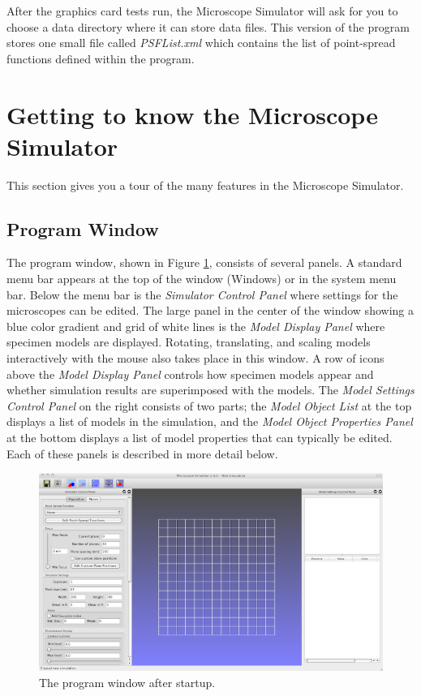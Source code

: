 \documentclass[11pt,titlepage,twoside]{article}
\begin{document}
After the graphics card tests run, the Microscope Simulator will ask for you to choose a data directory where it can store data files. This version of the program stores one small file called \emph{PSFList.xml} which contains the list of point-spread functions defined within the program.

\section{Getting to know the Microscope Simulator}

This section gives you a tour of the many features in the Microscope Simulator.

\subsection{Program Window}

The program window, shown in Figure \ref{fig:ProgramWindow}, consists of several panels. A standard menu bar appears at the top of the window (Windows) or in the system menu bar. Below the menu bar is the \emph{Simulator Control Panel} where settings for the microscopes can be edited. The large panel in the center of the window showing a blue color gradient and grid of white lines is the \emph{Model Display Panel} where specimen models are displayed. Rotating, translating, and scaling models interactively with the mouse also takes place in this window. A row of icons above the \emph{Model Display Panel} controls how specimen models appear and whether simulation results are superimposed with the models. The \emph{Model Settings Control Panel} on the right consists of two parts; the \emph{Model Object List} at the top displays a list of models in the simulation, and the \emph{Model Object Properties Panel} at the bottom displays a list of model properties that can typically be edited. Each of these panels is described in more detail below.

\begin{figure}[htbp] %
   \centering
   \includegraphics[width=1\linewidth]{images/ProgramWindow-small} 
   \caption{The program window after startup.}
   \label{fig:ProgramWindow}
\end{figure}
\end{document}
